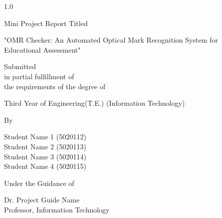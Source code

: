 \documentclass[oneside,12pt]{Classes/CUEDthesisPSnPDF}
\theoremstyle{definition}
\begin{document}
\begin{spacing}{1.0}
\begin{titlepage}
	\begin{center}
	
	\begin{large}
	Mini Project Report Titled
	\end{large}			
		 
		
		\vspace*{1\baselineskip}
		\begin{Large}
		"OMR Checker: An Automated Optical Mark Recognition System for Educational Assessment"\\
		\end{Large}
		
	
			
		
	
			
		\vspace*{2\baselineskip}
		Submitted\\
in partial fulfillment of\\
the requirements of the degree of\\
\vspace*{1\baselineskip}
		\begin{large}
		Third Year of Engineering(T.E.) (Information Technology) \\
		\end{large}
		\vspace*{1\baselineskip}
		
		By\\
		\vspace*{1\baselineskip}
		\begin{large}
			Student Name 1 (5020112)\\
			Student Name 2 (5020113)\\
			Student Name 3 (5020114)\\
			Student Name 4 (5020115)\\
                            		\end{large}
		
                         	   
		\vspace*{1\baselineskip}
		Under the Guidance of\\
		\vspace*{1\baselineskip}
		\begin{large}


 Dr. Project Guide Name\\
Professor, Information Technology\\
\end{large}
		

\end{center}
\end{titlepage}
\end{spacing}
\end{document}

